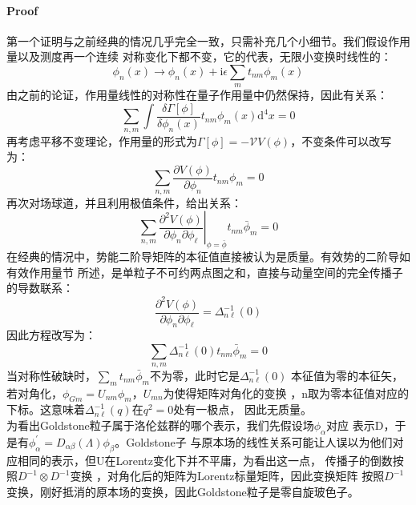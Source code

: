 \documentclass[12pt, a4paper, oneside]{ctexbook}
\begin{document}
	\paragraph*{Proof}
	第一个证明与之前经典的情况几乎完全一致，只需补充几个小细节。我们假设作用量以及测度再一个连续
	对称变化下都不变，它的代表，无限小变换时线性的：
	\begin{equation}
		\phi_n(x) \rightarrow \phi_n(x)+\mathrm{i} \epsilon \sum_m t_{n m} \phi_m(x)
	\end{equation}
	由之前的论证，作用量线性的对称性在量子作用量中仍然保持，因此有关系：
	\begin{equation*}
		\sum_{n, m} \int \frac{\delta \Gamma[\phi]}{\delta \phi_n(x)} t_{n m} \phi_m(x) \mathrm{d}^4 x=0
	\end{equation*}
	再考虑平移不变理论，作用量的形式为$ \Gamma[\phi]=-\mathscr{V} V(\phi) $，不变条件可以改写为：
	\begin{equation*}
		\sum_{n, m} \frac{\partial V(\phi)}{\partial \phi_n} t_{n m} \phi_m=0
	\end{equation*}
	再次对场球道，并且利用极值条件，给出关系：
	\begin{equation*}
		\left.\sum_{n, m} \frac{\partial^2 V(\phi)}{\partial \phi_n \partial \phi_{\ell}}\right|_{\phi=\bar{\phi}} t_{n m} \bar{\phi}_m=0
	\end{equation*}
	在经典的情况中，势能二阶导矩阵的本征值直接被认为是质量。有效势的二阶导如有效作用量节
	所述，是单粒子不可约两点图之和，直接与动量空间的完全传播子的导数联系：
	\begin{equation*}
		\frac{\partial^2 V(\phi)}{\partial \phi_n \partial \phi_{\ell}}=\Delta_{n \ell}^{-1}(0)
	\end{equation*}
	因此方程改写为：
	\begin{equation*}
		\sum_{n, m} \Delta_{n \ell}^{-1}(0) t_{n m} \bar{\phi}_m=0
	\end{equation*}
	当对称性破缺时，$ \sum_m t_{n m} \bar{\phi}_m $不为零，此时它是$ \Delta_{n \ell}^{-1}(0) $
	本征值为零的本征矢，若对角化，$ \phi_{Gm}=U_{nm}\phi_{m} $，$U_{mn}$为使得矩阵对角化的变换
	，n取为零本征值对应的下标。这意味着$ \Delta_{n \ell}^{-1}(q) $在$ q^2=0 $处有一极点，
	因此无质量。\\

	为看出Goldstone粒子属于洛伦兹群的哪个表示，我们先假设场$ \phi_\alpha $对应
	表示D，于是有$ \phi_\alpha^{\prime}=D_{\alpha \beta}(\Lambda) \phi_\beta $。Goldstone子
	与原本场的线性关系可能让人误以为他们对应相同的表示，但U在Lorentz变化下并不平庸，为看出这一点，
	传播子的倒数按照$ D^{-1}\otimes D^{-1} $变换 ，对角化后的矩阵为Lorentz标量矩阵，因此变换矩阵
	按照$ D^{-1} $变换，刚好抵消的原本场的变换，因此Goldstone粒子是零自旋玻色子。
\end{document}
